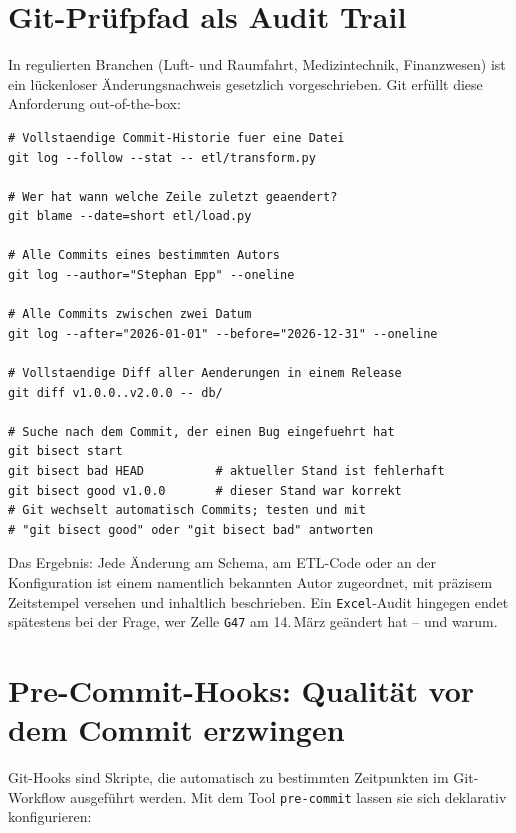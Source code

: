 \documentclass[12pt,a4paper]{report}
\theoremstyle{definition}
\theoremstyle{remark}
\newcommand{\excel}{\texttt{Excel}}
\newcommand{\code}[1]{\texttt{#1}}
\begin{document}
\section{Git-Prüfpfad als Audit Trail}

In regulierten Branchen (Luft- und Raumfahrt, Medizintechnik,
Finanzwesen) ist ein lückenloser Änderungsnachweis gesetzlich
vorgeschrieben. Git erfüllt diese Anforderung out-of-the-box:

\begin{lstlisting}[style=bash, caption={Audit-Trail-Abfragen mit Git}]
# Vollstaendige Commit-Historie fuer eine Datei
git log --follow --stat -- etl/transform.py

# Wer hat wann welche Zeile zuletzt geaendert?
git blame --date=short etl/load.py

# Alle Commits eines bestimmten Autors
git log --author="Stephan Epp" --oneline

# Alle Commits zwischen zwei Datum
git log --after="2026-01-01" --before="2026-12-31" --oneline

# Vollstaendige Diff aller Aenderungen in einem Release
git diff v1.0.0..v2.0.0 -- db/

# Suche nach dem Commit, der einen Bug eingefuehrt hat
git bisect start
git bisect bad HEAD          # aktueller Stand ist fehlerhaft
git bisect good v1.0.0       # dieser Stand war korrekt
# Git wechselt automatisch Commits; testen und mit
# "git bisect good" oder "git bisect bad" antworten
\end{lstlisting}

Das Ergebnis: Jede Änderung am Schema, am ETL-Code oder an der
Konfiguration ist einem namentlich bekannten Autor zugeordnet,
mit präzisem Zeitstempel versehen und inhaltlich beschrieben.
Ein \excel-Audit hingegen endet spätestens bei der Frage,
wer Zelle \code{G47} am 14.\,März geändert hat -- und warum.

\section{Pre-Commit-Hooks: Qualität vor dem Commit erzwingen}

Git-Hooks sind Skripte, die automatisch zu bestimmten Zeitpunkten
im Git-Workflow ausgeführt werden. Mit dem Tool \code{pre-commit}
lassen sie sich deklarativ konfigurieren:
\end{document}
